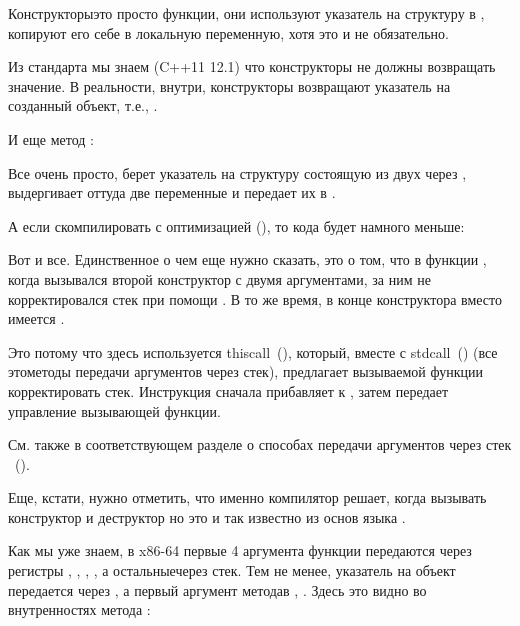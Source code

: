 

Конструкторы\EMDASH{}это просто функции, они используют указатель на структуру в \ECX, 
копируют его себе в локальную переменную, хотя это и не обязательно.

Из стандарта \Cpp мы знаем (C++11 12.1) 
что конструкторы не должны возвращать значение.
В реальности, внутри, конструкторы возвращают указатель на созданный объект, т.е., \ITthis.

И еще метод :



Все очень просто,  берет указатель на структуру состоящую из двух \Tint через \ECX, 
выдергивает оттуда две переменные и передает их в \printf.

А если скомпилировать с оптимизацией (\Ox), то кода будет намного меньше:



Вот и все. Единственное о чем еще нужно сказать, это о том, что в функции \main, 
когда вызывался второй конструктор с двумя аргументами, за ним не корректировался стек при помощи 
. В то же время, в конце конструктора вместо \RET имеется .

Это потому что здесь используется thiscall~(), который, вместе с stdcall~()
(все это\EMDASH{}методы передачи аргументов через стек), предлагает вызываемой функции корректировать стек. 
Инструкция  сначала прибавляет  к \ESP, затем передает управление вызывающей функции.

См. также в соответствующем разделе о способах передачи аргументов через стек
~().

Еще, кстати, нужно отметить, что именно компилятор решает, когда вызывать конструктор и деструктор\EMDASH{} 
но это и так известно из основ языка \Cpp.

\label{simple_CPP_MSVC_x64}

Как мы уже знаем, в x86-64 первые 4 аргумента функции передаются через регистры \RCX, \RDX, , 
, а остальные\EMDASH{}через стек.
Тем не менее, указатель на объект \ITthis передается через \RCX, а первый аргумент метода\EMDASH{}в \RDX,
\etc{}.
Здесь это видно во внутренностях метода 
:

